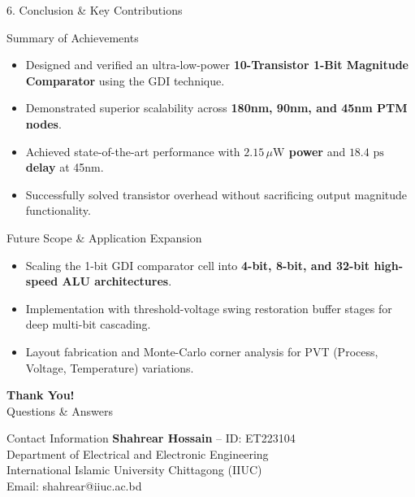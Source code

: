 \documentclass[aspectratio=169,10pt]{beamer}
\begin{document}
\begin{frame}{6. Conclusion \& Key Contributions}
  \begin{block}{Summary of Achievements}
    \begin{itemize}
      \item Designed and verified an ultra-low-power \textbf{10-Transistor 1-Bit Magnitude Comparator} using the GDI technique.
      \item Demonstrated superior scalability across \textbf{180nm, 90nm, and 45nm PTM nodes}.
      \item Achieved state-of-the-art performance with \textbf{$2.15\,\mu\text{W}$ power} and \textbf{$18.4\text{ ps}$ delay} at 45nm.
      \item Successfully solved transistor overhead without sacrificing output magnitude functionality.
    \end{itemize}
  \end{block}
  \pause
  \begin{block}{Future Scope \& Application Expansion}
    \begin{itemize}
      \item Scaling the 1-bit GDI comparator cell into \textbf{4-bit, 8-bit, and 32-bit high-speed ALU architectures}.
      \item Implementation with threshold-voltage swing restoration buffer stages for deep multi-bit cascading.
      \item Layout fabrication and Monte-Carlo corner analysis for PVT (Process, Voltage, Temperature) variations.
    \end{itemize}
  \end{block}
\end{frame}

\begin{frame}[plain]
  \centering
  \vfill
  {\Huge \textbf{\color{iiucblack} Thank You!}}\\[0.5cm]
  {\Large Questions \& Answers}\\[1cm]
  \begin{block}{\centering Contact Information}
    \centering
    \textbf{Shahrear Hossain} -- ID: ET223104\\
    Department of Electrical and Electronic Engineering\\
    International Islamic University Chittagong (IIUC)\\
    \small Email: shahrear@iiuc.ac.bd
  \end{block}
  \vfill
\end{frame}
\end{document}
